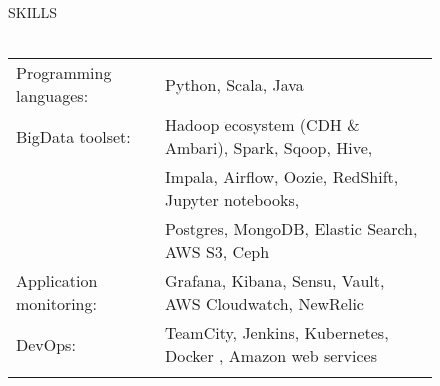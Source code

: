 \documentclass[letterpaper]{article}
\newcommand{\lineunder} {
    \vspace*{-8pt} \\
    \hspace*{-18pt} \hrulefill \\
}
\newcommand{\header} [1] {
    {\hspace*{-18pt}\vspace*{6pt} \textsc{#1}}
    \vspace*{-6pt} \lineunder
}
\begin{document}
\begin{figure}[b]
\header{SKILLS}
\begin{tabular}{ l l}
	Programming languages:  & Python, Scala, Java
	\\
	BigData toolset:        & Hadoop ecosystem (CDH \& Ambari), Spark, Sqoop, Hive,
	\\
	                        & Impala, Airflow, Oozie, RedShift, Jupyter notebooks,
	\\
	                        & Postgres, MongoDB, Elastic Search, AWS S3, Ceph
	\\
	Application monitoring: & Grafana, Kibana, Sensu, Vault, AWS Cloudwatch, NewRelic
	\\
	DevOps:                 & TeamCity, Jenkins, Kubernetes, Docker , Amazon web services
    \\\\
\end{tabular}
\end{figure}
\vspace{12mm}

\end{document}
